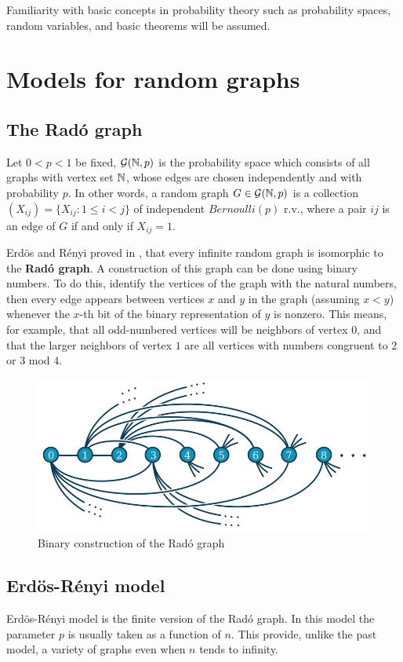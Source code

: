 Familiarity with basic concepts in probability theory such as probability spaces, random variables, and basic theorems will be assumed.

\section{Models for random graphs}

\subsection{The Radó graph}
Let $0 < p < 1$ be fixed, $\mathcal{G}(\mathbb{N}, p)$ is the probability space which consists of all graphs with vertex set $\mathbb{N}$, whose edges are chosen independently and with probability $p$. In other words, a random graph $G \in \mathcal{G}(\mathbb{N},p)$ is a collection $(X_{ij}) = \{ X_{ij} : 1 \leq i < j\}$ of independent $Bernoulli(p)$ r.v., where a pair $ij$ is an edge of $G$ if and only if $X_{ij} = 1$.

Erdös and Rényi proved in \cite[Erdös, Rényi]{RadoUnique}, that every infinite random graph is isomorphic to the \textbf{Radó graph}. A construction of this graph can be done using binary numbers. To do this, identify the vertices of the graph with the natural numbers, then every edge appears between vertices $x$ and $y$ in the graph (assuming $x < y$) whenever the $x$-th bit of the binary representation of $y$ is nonzero. This means, for example, that all odd-numbered vertices will be neighbors of vertex $0$, and that the larger neighbors of vertex $1$ are all vertices with numbers congruent to $2$ or $3$ mod $4$. 

\begin{figure}[h!]
	\centering
	\includegraphics[scale=0.7]{Figures/Rado-graph.png}
	\caption{Binary construction of the Radó graph}
\end{figure}

\subsection{Erdös-Rényi model}
Erdös-Rényi model is the finite version of the Radó graph. In this model the parameter $p$ is usually taken as a function of $n$. This provide, unlike the past model, a variety of graphs even when $n$ tends to infinity.

